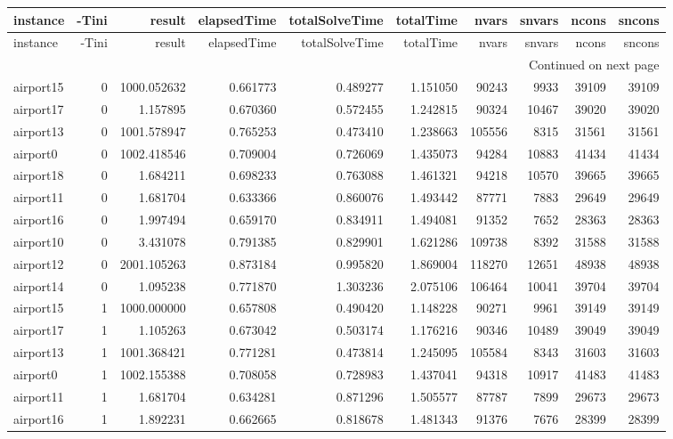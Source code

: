 
\begin{longtable}{|l|r|r|r|r|r|r|r|r|r|}
\toprule
instance & -Tini & result & elapsedTime & totalSolveTime & totalTime & nvars & snvars & ncons & sncons \\
\midrule
\endfirsthead
\toprule
instance & -Tini & result & elapsedTime & totalSolveTime & totalTime & nvars & snvars & ncons & sncons \\
\midrule
\endhead
\midrule
\multicolumn{10}{r}{Continued on next page} \\
\midrule
\endfoot
\bottomrule
\endlastfoot
airport15 & 0 & 1000.052632 & 0.661773 & 0.489277 & 1.151050 & 90243 & 9933 & 39109 & 39109 \\
airport17 & 0 & 1.157895 & 0.670360 & 0.572455 & 1.242815 & 90324 & 10467 & 39020 & 39020 \\
airport13 & 0 & 1001.578947 & 0.765253 & 0.473410 & 1.238663 & 105556 & 8315 & 31561 & 31561 \\
airport0 & 0 & 1002.418546 & 0.709004 & 0.726069 & 1.435073 & 94284 & 10883 & 41434 & 41434 \\
airport18 & 0 & 1.684211 & 0.698233 & 0.763088 & 1.461321 & 94218 & 10570 & 39665 & 39665 \\
airport11 & 0 & 1.681704 & 0.633366 & 0.860076 & 1.493442 & 87771 & 7883 & 29649 & 29649 \\
airport16 & 0 & 1.997494 & 0.659170 & 0.834911 & 1.494081 & 91352 & 7652 & 28363 & 28363 \\
airport10 & 0 & 3.431078 & 0.791385 & 0.829901 & 1.621286 & 109738 & 8392 & 31588 & 31588 \\
airport12 & 0 & 2001.105263 & 0.873184 & 0.995820 & 1.869004 & 118270 & 12651 & 48938 & 48938 \\
airport14 & 0 & 1.095238 & 0.771870 & 1.303236 & 2.075106 & 106464 & 10041 & 39704 & 39704 \\
airport15 & 1 & 1000.000000 & 0.657808 & 0.490420 & 1.148228 & 90271 & 9961 & 39149 & 39149 \\
airport17 & 1 & 1.105263 & 0.673042 & 0.503174 & 1.176216 & 90346 & 10489 & 39049 & 39049 \\
airport13 & 1 & 1001.368421 & 0.771281 & 0.473814 & 1.245095 & 105584 & 8343 & 31603 & 31603 \\
airport0 & 1 & 1002.155388 & 0.708058 & 0.728983 & 1.437041 & 94318 & 10917 & 41483 & 41483 \\
airport11 & 1 & 1.681704 & 0.634281 & 0.871296 & 1.505577 & 87787 & 7899 & 29673 & 29673 \\
airport16 & 1 & 1.892231 & 0.662665 & 0.818678 & 1.481343 & 91376 & 7676 & 28399 & 28399 \\

\end{longtable}
